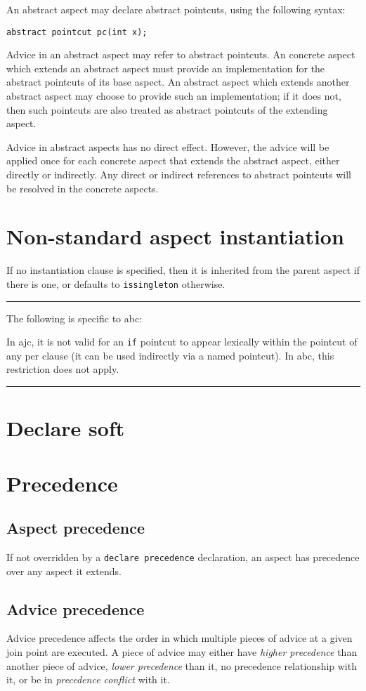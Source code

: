 \documentclass[12pt,a4paper]{report}
\newcommand\abcdistinctionbegin[0]{%
\hrule
\noindent
The following is specific to abc:

\noindent
}
\newcommand\abcdistinctionend[0]{%
\hrule
}
\begin{document}
An abstract aspect may declare abstract pointcuts, using the following
syntax:

\begin{verbatim}
abstract pointcut pc(int x);
\end{verbatim}

Advice in an abstract
aspect may refer to abstract pointcuts. An concrete 
aspect which extends an abstract
aspect must provide an implementation for the abstract pointcuts of its
base aspect. An abstract aspect which extends another abstract aspect
may choose to provide such an implementation; if it does not, then 
such pointcuts are also treated as abstract pointcuts of the extending aspect.

Advice in abstract aspects has no direct effect. However, the advice
will be applied once for each concrete aspect that extends the abstract 
aspect, either directly or indirectly. Any direct or indirect 
references to abstract pointcuts will be resolved in the concrete aspects.

\chapter{Non-standard aspect instantiation}

If no instantiation clause is specified, then it is inherited from the parent
aspect if there is one, or defaults to \verb|issingleton| otherwise.

\abcdistinctionbegin
In ajc, it is not valid for an \verb|if| pointcut to appear lexically
within the pointcut of any per clause (it can be used indirectly via a 
named pointcut). In abc, this restriction does not apply.
\abcdistinctionend

\chapter{Declare soft}

\chapter{Precedence}
\section{Aspect precedence}
If not overridden by a \verb|declare precedence| declaration, an aspect 
has precedence over any aspect it extends.

\section{Advice precedence}
Advice precedence affects the order in which multiple pieces of advice
at a given join point are executed. A piece of advice may either have 
{\em higher precedence} than another piece of advice, 
{\em lower precedence} than it, 
no precedence relationship with it, 
or be in {\em precedence conflict} with it.
\end{document}
